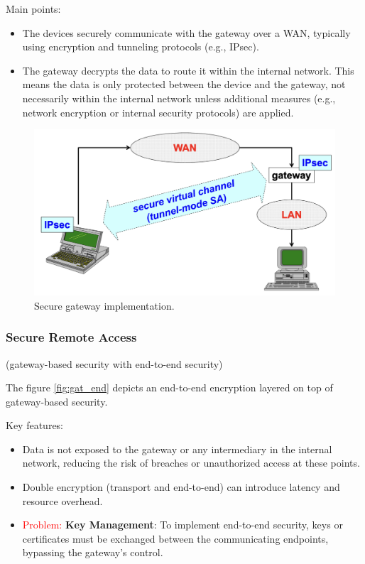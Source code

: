 Main points:
\begin{itemize}
    \item The devices securely communicate with the gateway over a WAN, typically using encryption and tunneling protocols (e.g., IPsec).
    \item The gateway decrypts the data to route it within the internal network. This means the data is only protected between the device and the gateway, not necessarily within the internal network unless additional measures (e.g., network encryption or internal security protocols) are applied.
\end{itemize}

\begin{figure}[H]
  \includegraphics[width=\linewidth]{Images/NetSec/secure_gateway.png}
  \caption{Secure gateway implementation.}
  \label{fig:secgat}
\end{figure}

\subsubsection{Secure Remote Access}
\begin{center}
    (gateway-based security with end-to-end security)
\end{center}

The figure \ref{fig:gat_end} depicts an end-to-end encryption layered on top of gateway-based security. 

Key features:
\begin{itemize}
    \item Data is not exposed to the gateway or any intermediary in the internal network, reducing the risk of breaches or unauthorized access at these points.
    \item Double encryption (transport and end-to-end) can introduce latency and resource overhead.
    \item \textcolor{red}{Problem: }\textbf{Key Management}: To implement end-to-end security, keys or certificates must be exchanged between the communicating endpoints, bypassing the gateway’s control.
\end{itemize}


